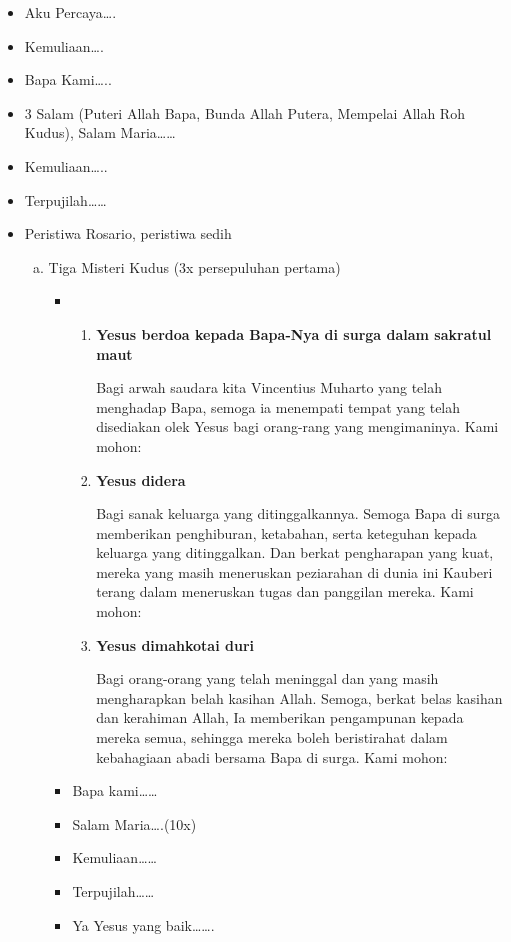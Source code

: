 \documentclass[a5paper,titlepage,12pt]{scrbook}
\newcommand{\arwah}{Vincentius Muharto }
\begin{document}
\begin{itemize}
	\item Aku Percaya{\dots}.
	\item Kemuliaan{\dots}.
	\item Bapa Kami{\dots}..
	\item 3 Salam (Puteri Allah Bapa, Bunda Allah Putera, Mempelai Allah Roh Kudus), Salam Maria{\dots}{\dots}
	\item Kemuliaan{\dots}..
	\item Terpujilah{\dots}{\dots}
	\item Peristiwa Rosario, peristiwa sedih 
	
	\begin{enumerate}[a.]
		\item Tiga Misteri Kudus (3x persepuluhan pertama)		
			\begin{itemize}
				\item 
				 	\begin{enumerate}
						\item \textbf{Yesus berdoa kepada Bapa-Nya di surga dalam sakratul maut}
						
Bagi arwah saudara kita \arwah yang telah menghadap
Bapa, semoga ia menempati tempat yang telah disediakan olek Yesus bagi orang-rang yang
mengimaninya. Kami mohon:						
						
						\item \textbf{Yesus didera}
						
						Bagi sanak keluarga yang ditinggalkannya. Semoga Bapa di surga memberikan penghiburan,
ketabahan, serta keteguhan kepada keluarga yang ditinggalkan.  Dan  berkat  pengharapan yang
kuat, mereka yang masih meneruskan peziarahan di dunia ini Kauberi terang dalam meneruskan
tugas dan panggilan mereka. Kami mohon:

						\item \textbf{Yesus dimahkotai duri}

Bagi orang-orang yang telah meninggal dan
yang masih mengharapkan belah kasihan Allah.
Semoga, berkat belas kasihan dan kerahiman
Allah, Ia memberikan pengampunan kepada mereka semua, 
sehingga mereka boleh beristirahat dalam kebahagiaan abadi bersama Bapa
di surga. Kami mohon:

					\end{enumerate}
				\item Bapa kami{\dots}{\dots}
				\item Salam Maria{\dots}.(10x)
				\item Kemuliaan{\dots}{\dots}
				\item Terpujilah{\dots}{\dots}
				\item Ya Yesus yang baik{\dots}{\dots}.
			\end{itemize}


\end{enumerate}
\end{itemize}
\end{document}

